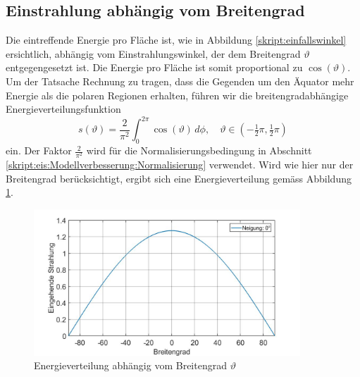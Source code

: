 \begin{refsection}
\subsection{Einstrahlung abhängig vom Breitengrad}
Die eintreffende Energie pro Fläche ist, wie in Abbildung \ref{skript:einfallswinkel} ersichtlich, abhängig vom Einstrahlungswinkel, der dem Breitengrad $\vartheta$ entgegengesetzt ist. Die Energie pro Fläche ist somit proportional zu $\cos(\vartheta)$. Um der Tatsache Rechnung zu tragen, dass die Gegenden um den Äquator mehr Energie als die polaren Regionen erhalten, führen wir die breitengradabhängige Energieverteilungsfunktion
\begin{equation}\label{skript:eis:Energieverteilung Breitengrad}
s(\vartheta)
=
\frac{2}{\pi^2}\int_{0}^{2\pi}\cos(\vartheta)\,d\phi,\quad
\vartheta\in(-\tfrac{1}{2}\pi,\tfrac{1}{2}\pi)
\end{equation}
ein. Der Faktor $\frac{2}{\pi^2}$ wird für die Normalisierungsbedingung in Abschnitt \ref{skript:eis:Modellverbesserung:Normalisierung} verwendet. Wird wie hier nur der Breitengrad berücksichtigt, ergibt sich eine Energieverteilung gemäss Abbildung \ref{skript:eis:fig:Einstrahlung_abh_vom_Breitengrad}.
\begin{figure}
 	\centering
 	\includegraphics[width=10cm]{eis/Einstrahlung_abh_vom_Breitengrad.jpg}
 	\caption{Energieverteilung abhängig vom Breitengrad $\vartheta$}
 	\label{skript:eis:fig:Einstrahlung_abh_vom_Breitengrad}
\end{figure}

\end{refsection}
